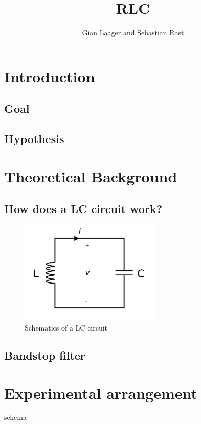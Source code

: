 \documentclass[a4paper,11pt]{article}
\title{RLC}
\author{Gian Laager and Sebastian Rast}
\begin{document}
\maketitle

\tableofcontents
\newpage

\section{Introduction}

\subsection{Goal}
\subsection{Hypothesis}

\section{Theoretical Background}
\subsection{How does a LC circuit work?}

\begin{figure}[!ht]
    \centering
    \includegraphics[width=0.6\textwidth]{images/2560px-LC_parallel_simple.svg.png}
    \caption{Schematics of a LC circuit}
    \label{fig:my_label}
\end{figure}

\subsection{Bandstop filter}




\section{Experimental arrangement}
schema
\end{document}

